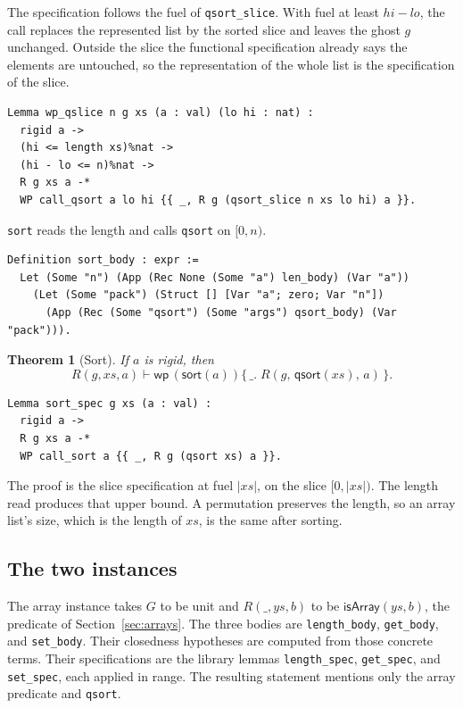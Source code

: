 \documentclass[11pt]{article}
\newtheorem{theorem}{Theorem}
\newcommand{\Wpre}{\mathsf{wp}}
\begin{document}
The specification follows the fuel of \texttt{qsort\_slice}.
With fuel at least \(hi - lo\), the call replaces the represented list by the sorted slice and leaves the ghost \(g\) unchanged.
Outside the slice the functional specification already says the elements are untouched, so the representation of the whole list is the specification of the slice.

\begin{lstlisting}
Lemma wp_qslice n g xs (a : val) (lo hi : nat) :
  rigid a ->
  (hi <= length xs)%nat ->
  (hi - lo <= n)%nat ->
  R g xs a -*
  WP call_qsort a lo hi {{ _, R g (qsort_slice n xs lo hi) a }}.
\end{lstlisting}

\texttt{sort} reads the length and calls \texttt{qsort} on \([0, n)\).

\begin{lstlisting}
Definition sort_body : expr :=
  Let (Some "n") (App (Rec None (Some "a") len_body) (Var "a"))
    (Let (Some "pack") (Struct [] [Var "a"; zero; Var "n"])
      (App (Rec (Some "qsort") (Some "args") qsort_body) (Var "pack"))).
\end{lstlisting}

\begin{theorem}[Sort]
If \(a\) is rigid, then
\[
R(g, xs, a) \vdash
  \Wpre\,(\mathsf{sort}(a))
  \{\,\_.\; R(g,\, \mathsf{qsort}(xs),\, a)\,\}.
\]
\end{theorem}

\begin{lstlisting}
Lemma sort_spec g xs (a : val) :
  rigid a ->
  R g xs a -*
  WP call_sort a {{ _, R g (qsort xs) a }}.
\end{lstlisting}

The proof is the slice specification at fuel \(\lvert xs \rvert\), on the slice \([0, \lvert xs \rvert)\).
The length read produces that upper bound.
A permutation preserves the length, so an array list's size, which is the length of \(xs\), is the same after sorting.

\subsection{The two instances}

The array instance takes \(G\) to be unit and \(R(\_, ys, b)\) to be \(\mathsf{isArray}(ys, b)\), the predicate of Section~\ref{sec:arrays}.
The three bodies are \texttt{length\_body}, \texttt{get\_body}, and \texttt{set\_body}.
Their closedness hypotheses are computed from those concrete terms.
Their specifications are the library lemmas \texttt{length\_spec}, \texttt{get\_spec}, and \texttt{set\_spec}, each applied in range.
The resulting statement mentions only the array predicate and \texttt{qsort}.
\end{document}

